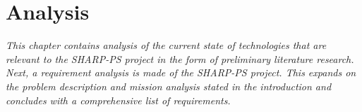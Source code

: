 \chapter{Analysis}%
\label{chap:analysis}

\emph{This chapter contains analysis of the current state of technologies that are relevant to the SHARP-PS project in the form of preliminary literature research. Next, a requirement analysis is made of the SHARP-PS project. This expands on the problem description and mission analysis stated in the introduction and concludes with a comprehensive list of requirements.}

\newpage


% 
% 

